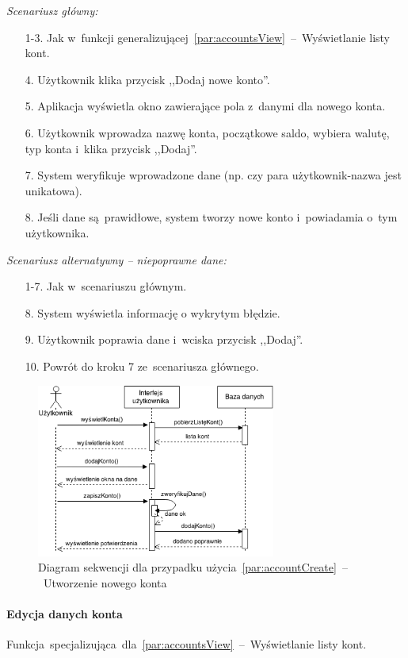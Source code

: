\noindent \textit{Scenariusz główny:}
\begin{enumerate}
  \item[1-3.] Jak w~funkcji generalizującej~\ref{par:accountsView}~--~Wyświetlanie listy kont.
  \item[4.] Użytkownik klika przycisk ,,Dodaj nowe konto''.
  \item[5.] Aplikacja wyświetla okno zawierające pola z~danymi dla nowego konta.
  \item[6.] Użytkownik wprowadza nazwę konta, początkowe saldo, wybiera walutę, typ konta i~klika przycisk ,,Dodaj''.
  \item[7.] System weryfikuje wprowadzone dane (np. czy para użytkownik-nazwa jest unikatowa).
  \item[8.] Jeśli dane są~prawidłowe, system tworzy nowe konto i~powiadamia o~tym użytkownika.
\end{enumerate}

\noindent \textit{Scenariusz alternatywny -- niepoprawne dane:}
\begin{enumerate}
  \item[1-7.] Jak w~scenariuszu głównym.
  \item[8.] System wyświetla informację o wykrytym błędzie.
  \item[9.] Użytkownik poprawia dane i~wciska przycisk ,,Dodaj''.
  \item[10.] Powrót do kroku 7 ze~scenariusza głównego.
\end{enumerate}

\begin{figure}[H]
  \centering
  \includegraphics[width=0.7\textwidth]{images/sequence-diagram-account-create.png}
  \caption{Diagram sekwencji dla przypadku użycia~\ref{par:accountCreate}~--~Utworzenie nowego konta}
\end{figure}

\paragraph{Edycja danych konta\newline}
\label{par:accountEdit}
Funkcja~specjalizująca~dla~\ref{par:accountsView}~--~Wyświetlanie listy kont.\\

